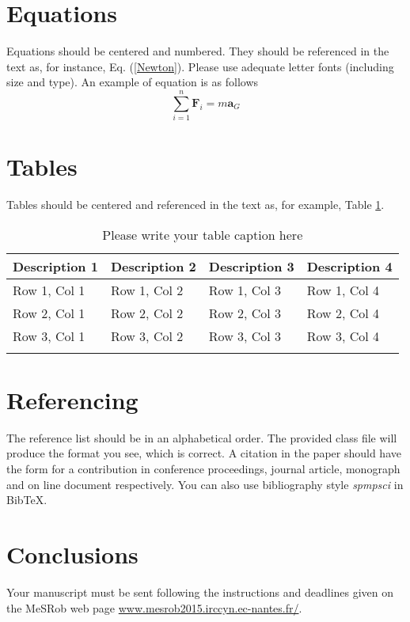 \documentclass{svmult}
\begin{document}
\section{Equations}

Equations should be centered and numbered. They should be referenced in the text as, for instance, Eq. (\ref{Newton}). Please use adequate letter fonts (including size and type). An example of equation is as follows
\begin{equation}\label{Newton}
\sum\limits_{i = 1}^n {{\mathbf{F}}_{i} }  = m \mathbf{a}_G
\end{equation}


\section{Tables}

Tables should be centered and referenced in the text as, for
example, Table \ref{tri}.

\begin{table}
\caption{Please write your table caption here}
\label{tri}
\centering
\begin{tabular}{p{2cm}p{2.4cm}p{2cm}p{2.4cm}}
\svhline\noalign{\smallskip}
Description 1 & Description 2 & Description 3 & Description 4  \\
\hline\noalign{\smallskip}
Row 1, Col 1 & Row 1, Col 2  & Row 1, Col 3 & Row 1, Col 4\\
Row 2, Col 1 & Row 2, Col 2  & Row 2, Col 3 & Row 2, Col 4\\
Row 3, Col 1 & Row 3, Col 2  & Row 3, Col 3 & Row 3, Col 4\\
\svhline\noalign{\smallskip}
\end{tabular}
\end{table}






\section{Referencing}

The reference list should be in an alphabetical order. The provided
class file will produce the format you see, which is correct. A citation
in the paper should have the form \cite{contrib,journal,mono,online} for a contribution in conference proceedings, journal article, monograph and on line document respectively. You can also use bibliography style \textit{spmpsci} in BibTeX.


\section{Conclusions}
Your manuscript must be sent following the instructions and deadlines given on the MeSRob web page \url{www.mesrob2015.irccyn.ec-nantes.fr/}.
\end{document}
